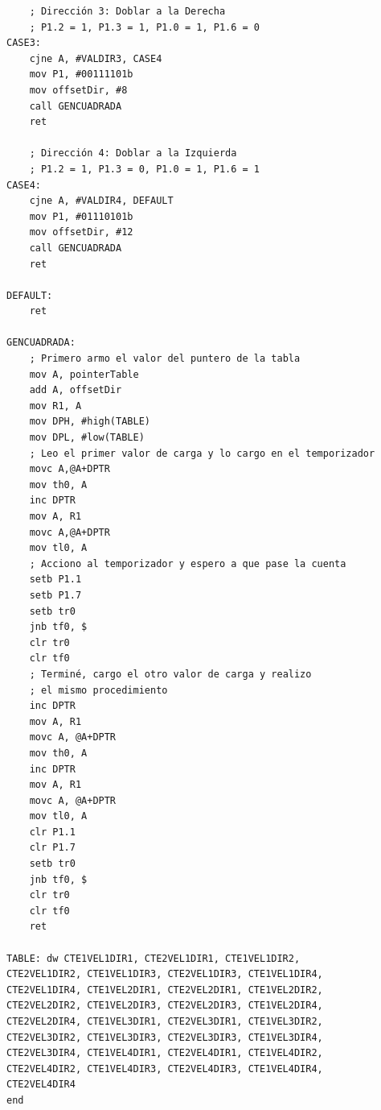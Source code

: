 \documentclass[a4paper,10pt]{article}
\begin{document}
\begin{verbatim}
	; Dirección 3: Doblar a la Derecha
	; P1.2 = 1, P1.3 = 1, P1.0 = 1, P1.6 = 0
CASE3:
	cjne A, #VALDIR3, CASE4
	mov P1, #00111101b
	mov offsetDir, #8
	call GENCUADRADA
	ret

	; Dirección 4: Doblar a la Izquierda
	; P1.2 = 1, P1.3 = 0, P1.0 = 1, P1.6 = 1
CASE4:
	cjne A, #VALDIR4, DEFAULT
	mov P1, #01110101b
	mov offsetDir, #12
	call GENCUADRADA
	ret

DEFAULT:
	ret

GENCUADRADA:
	; Primero armo el valor del puntero de la tabla
	mov A, pointerTable
	add A, offsetDir
	mov R1, A
	mov DPH, #high(TABLE)
	mov DPL, #low(TABLE)
	; Leo el primer valor de carga y lo cargo en el temporizador
	movc A,@A+DPTR
	mov th0, A
	inc DPTR
	mov A, R1
	movc A,@A+DPTR
	mov tl0, A
	; Acciono al temporizador y espero a que pase la cuenta
	setb P1.1
	setb P1.7
	setb tr0
	jnb tf0, $
	clr tr0
	clr tf0
	; Terminé, cargo el otro valor de carga y realizo 
	; el mismo procedimiento
	inc DPTR
	mov A, R1
	movc A, @A+DPTR
	mov th0, A
	inc DPTR 
	mov A, R1
	movc A, @A+DPTR
	mov tl0, A
	clr P1.1 
	clr P1.7
	setb tr0
	jnb tf0, $
	clr tr0
	clr tf0
	ret

TABLE: dw CTE1VEL1DIR1, CTE2VEL1DIR1, CTE1VEL1DIR2, 
CTE2VEL1DIR2, CTE1VEL1DIR3, CTE2VEL1DIR3, CTE1VEL1DIR4, 
CTE2VEL1DIR4, CTE1VEL2DIR1, CTE2VEL2DIR1, CTE1VEL2DIR2, 
CTE2VEL2DIR2, CTE1VEL2DIR3, CTE2VEL2DIR3, CTE1VEL2DIR4, 
CTE2VEL2DIR4, CTE1VEL3DIR1, CTE2VEL3DIR1, CTE1VEL3DIR2, 
CTE2VEL3DIR2, CTE1VEL3DIR3, CTE2VEL3DIR3, CTE1VEL3DIR4, 
CTE2VEL3DIR4, CTE1VEL4DIR1, CTE2VEL4DIR1, CTE1VEL4DIR2, 
CTE2VEL4DIR2, CTE1VEL4DIR3, CTE2VEL4DIR3, CTE1VEL4DIR4, 
CTE2VEL4DIR4
end

				\end{verbatim}
\end{document}
